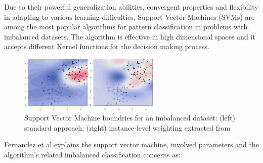 Due to their powerful generalization abilities, convergent properties and flexibility in 
adapting to various learning difficulties, Support Vector Machines (SVMs)\cite{vapnik2013nature} 
are among the most popular algorithms for pattern classification in problems with imbalanced datasets. 
The algorithm is effective in high dimensional spaces and it accepts different Kernel 
functions for the decision making process.

\begin{figure}[ht]
    \centering
    \includegraphics[width=0.60\textwidth]{figures/13svmAlgorithm.png}
    \caption{Support Vector Machine boundries for an imbalanced dataset: 
    (left) standard approach; (right) instance-level 
    weighting extracted from~\cite{fernandez_learning_2018}}
    \label{fig:svmBoundries}
\end{figure}

Fernandez et al \cite{fernandez_learning_2018} explains the support vector machine, involved parameters 
and the algorithm's related imbalanced classification concerns as:


